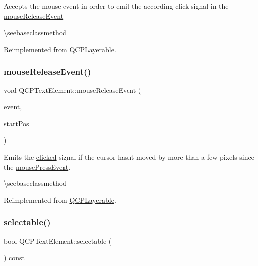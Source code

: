 Accepts the mouse event in order to emit the according click signal in the \mbox{\hyperlink{class_q_c_p_text_element_acfcbaf9b1da18745e72726aafb39c855}{mouse\+Release\+Event}}.

\textbackslash{}seebaseclassmethod 

Reimplemented from \mbox{\hyperlink{class_q_c_p_layerable_af6567604818db90f4fd52822f8bc8376}{Q\+C\+P\+Layerable}}.

\mbox{\label{class_q_c_p_text_element_acfcbaf9b1da18745e72726aafb39c855}} 
\subsubsection{\texorpdfstring{mouseReleaseEvent()}{mouseReleaseEvent()}}
{\footnotesize\ttfamily void Q\+C\+P\+Text\+Element\+::mouse\+Release\+Event (\begin{DoxyParamCaption}\item[{Q\+Mouse\+Event $\ast$}]{event,  }\item[{const Q\+PointF \&}]{start\+Pos }\end{DoxyParamCaption})\hspace{0.3cm}{\ttfamily [virtual]}}

Emits the \mbox{\hyperlink{class_q_c_p_text_element_ad2246a0e701c0655623f048737298334}{clicked}} signal if the cursor hasn\textquotesingle{}t moved by more than a few pixels since the \mbox{\hyperlink{class_q_c_p_text_element_ad7b2c98355e3d2f912574b74fcee0574}{mouse\+Press\+Event}}.

\textbackslash{}seebaseclassmethod 

Reimplemented from \mbox{\hyperlink{class_q_c_p_layerable_aa0d79b005686f668622bbe66ac03ba2c}{Q\+C\+P\+Layerable}}.

\mbox{\label{class_q_c_p_text_element_a96e2a712fca40324a8489f75833b4096}} 
\subsubsection{\texorpdfstring{selectable()}{selectable()}}
{\footnotesize\ttfamily bool Q\+C\+P\+Text\+Element\+::selectable (\begin{DoxyParamCaption}{ }\end{DoxyParamCaption}) const\hspace{0.3cm}{\ttfamily [inline]}}

